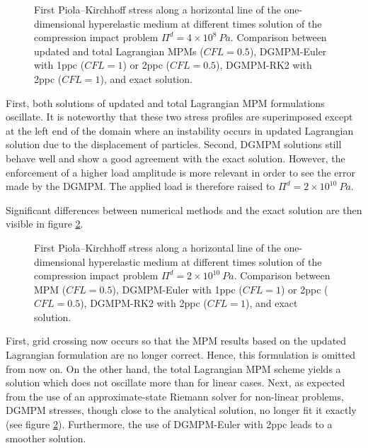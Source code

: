 \begin{figure}[h!]
  \centering
  {}
  \caption{First Piola–Kirchhoff stress along a horizontal line of the one-dimensional hyperelastic medium at different times solution of the compression impact problem $\Pi^d= 4\times 10^{8} \: Pa$. Comparison between updated and total Lagrangian MPMs ($CFL=0.5$), DGMPM-Euler with 1ppc ($CFL=1$) or 2ppc ($CFL=0.5$), DGMPM-RK2 with 2ppc ($CFL=1$), and exact solution.}
  \label{fig:he_rarefaction_UL}
\end{figure}
First, both solutions of updated and total Lagrangian MPM formulations oscillate.
It is noteworthy that these two stress profiles are superimposed except at the left end of the domain where an instability occurs in updated Lagrangian solution due to the displacement of particles.
Second, DGMPM solutions still behave well and show a good agreement with the exact solution. However, the enforcement of a higher load amplitude is more relevant in order to see the error made by the DGMPM.
The applied load is therefore raised to $\Pi^d= 2\times 10^{10} \: Pa$.

Significant differences between numerical methods and the exact solution are then visible in figure \ref{fig:he_rarefaction}.
\begin{figure}[h!]
  \centering
  {}
  {}
  {}
  \caption{First Piola–Kirchhoff stress along a horizontal line of the one-dimensional hyperelastic medium at different times solution of the compression impact problem $\Pi^d= 2\times 10^{10} \: Pa$. Comparison between MPM ($CFL=0.5$), DGMPM-Euler with 1ppc ($CFL=1$) or 2ppc ($CFL=0.5$), DGMPM-RK2 with 2ppc ($CFL=1$), and exact solution.}
  \label{fig:he_rarefaction}
\end{figure}
First, grid crossing now occurs so that the MPM results based on the updated Lagrangian formulation are no longer correct. Hence, this formulation is omitted from now on.
On the other hand, the total Lagrangian MPM scheme yields a solution which does not oscillate more than for linear cases.
Next, as expected from the use of an approximate-state Riemann solver for non-linear problems, DGMPM stresses, though close to the analytical solution, no longer fit it exactly (see figure \ref{fig:he_rarefaction}).
Furthermore, the use of DGMPM-Euler with 2ppc leads to a smoother solution.


